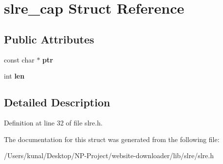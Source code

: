 \hypertarget{structslre__cap}{}\section{slre\+\_\+cap Struct Reference}
\label{structslre__cap}
\subsection*{Public Attributes}
\begin{DoxyCompactItemize}
\item 
\mbox{\label{structslre__cap_a2c527cad75b185ebf7da086064cc1ee8}} 
const char $\ast$ {\bfseries ptr}
\item 
\mbox{\label{structslre__cap_ac804caf49ff0effb42a2518820e01661}} 
int {\bfseries len}
\end{DoxyCompactItemize}


\subsection{Detailed Description}


Definition at line 32 of file slre.\+h.



The documentation for this struct was generated from the following file\+:\begin{DoxyCompactItemize}
\item 
/\+Users/kunal/\+Desktop/\+N\+P-\/\+Project/website-\/downloader/lib/slre/slre.\+h\end{DoxyCompactItemize}

